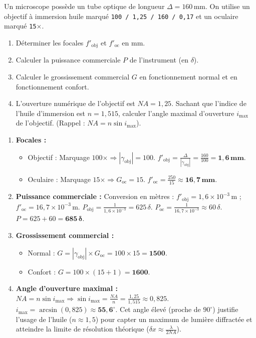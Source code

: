 \documentclass[11pt]{article}
\begin{document}
\begin{exercice}
Un microscope possède un tube optique de longueur $\Delta = 160\,\text{mm}$. On utilise un objectif à immersion huile marqué \texttt{100 / 1,25 / 160 / 0,17} et un oculaire marqué \texttt{15$\times$}.
\begin{enumerate}
    \item Déterminer les focales $f'_{\text{obj}}$ et $f'_{\text{oc}}$ en mm.
    \item Calculer la puissance commerciale $P$ de l'instrument (en $\delta$).
    \item Calculer le grossissement commercial $G$ en fonctionnement normal et en fonctionnement confort.
    \item L'ouverture numérique de l'objectif est $NA = 1,25$. Sachant que l'indice de l'huile d'immersion est $n = 1,515$, calculer l'angle maximal d'ouverture $i_{\max}$ de l'objectif. (Rappel : $NA = n \sin i_{\max}$).
\end{enumerate}
\end{exercice}

\begin{corrige}
\begin{enumerate}
    \item \textbf{Focales :}
    \begin{itemize}
        \item Objectif : Marquage $100\times \Rightarrow |\gamma_{\text{obj}}| = 100$. $f'_{\text{obj}} = \frac{\Delta}{|\gamma_{\text{obj}}|} = \frac{160}{100} = \mathbf{1,6\,mm}$.
        \item Oculaire : Marquage $15\times \Rightarrow G_{\text{oc}} = 15$. $f'_{\text{oc}} = \frac{250}{15} \approx \mathbf{16,7\,mm}$.
    \end{itemize}
    \item \textbf{Puissance commerciale :}
    Conversion en mètres : $f'_{\text{obj}} = 1,6 \times 10^{-3}\,\text{m}$ ; $f'_{\text{oc}} = 16,7 \times 10^{-3}\,\text{m}$.
    $P_{\text{obj}} = \frac{1}{1,6 \times 10^{-3}} = 625\,\delta$.
    $P_{\text{oc}} = \frac{1}{16,7 \times 10^{-3}} \approx 60\,\delta$.
    $P = 625 + 60 = \mathbf{685\,\delta}$.
    \item \textbf{Grossissement commercial :}
    \begin{itemize}
        \item Normal : $G = |\gamma_{\text{obj}}| \times G_{\text{oc}} = 100 \times 15 = \mathbf{1500}$.
        \item Confort : $G = 100 \times (15 + 1) = \mathbf{1600}$.
    \end{itemize}
    \item \textbf{Angle d'ouverture maximal :}
    $NA = n \sin i_{\max} \Rightarrow \sin i_{\max} = \frac{NA}{n} = \frac{1,25}{1,515} \approx 0,825$.
    $i_{\max} = \arcsin(0,825) \approx \mathbf{55,6^\circ}$.
    Cet angle élevé (proche de $90^\circ$) justifie l'usage de l'huile ($n \approx 1,5$) pour capter un maximum de lumière diffractée et atteindre la limite de résolution théorique ($\delta x \approx \frac{\lambda}{2 NA}$).
\end{enumerate}
\end{corrige}
\end{document}
